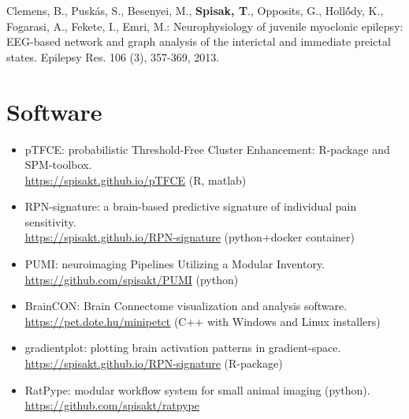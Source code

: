 \documentclass[12pt,a4paper,roman]{moderncv}        %
\begin{document}
Clemens, B., Puskás, S., Besenyei, M.,\textbf{ Spisak, T}., Opposits, G., Holló́́́dy, K., Fogarasi, A., Fekete, I., Emri, M.: Neurophysiology of juvenile myoclonic epilepsy: EEG-based network and graph analysis of the interictal and immediate preictal states. Epilepsy Res. 106 (3), 357-369, 2013.

\section{Software}
\begin{itemize}

\item pTFCE: probabilistic Threshold-Free Cluster Enhancement: R-package and SPM-toolbox. \\ \href{https://spisakt.github.io/pTFCE/}{\color{pniblue}\underline{https://spisakt.github.io/pTFCE}} (R, matlab)

\item RPN-signature: a brain-based predictive signature of individual pain sensitivity. \\ \href{https://spisakt.github.io/RPN-signature}{\color{pniblue}\underline{https://spisakt.github.io/RPN-signature}} (python+docker container)

\item PUMI: neuroimaging Pipelines Utilizing a Modular Inventory. \\ \href{https://github.com/spisakt/PUMI}{\color{pniblue}\underline{https://github.com/spisakt/PUMI}} (python)

\item BrainCON: Brain Connectome visualization and analysis software. \\ \href{https://pet.dote.hu/minipetct/index.php?option=com_k2&view=item&layout=item&id=5&Itemid=13&lang=en}{\color{pniblue}\underline{https://pet.dote.hu/minipetct}} (C++ with Windows and Linux installers)

\item gradientplot: plotting brain activation patterns in gradient-space. \\ \href{https://spisakt.github.io/RPN-signature}{\color{pniblue}\underline{https://spisakt.github.io/RPN-signature}} (R-package)

\item RatPype: modular workflow system for small animal imaging (python). \\
\href{https://github.com/spisakt/ratpype}{\color{pniblue}\underline{https://github.com/spisakt/ratpype}}

\end{itemize}
\end{document}
